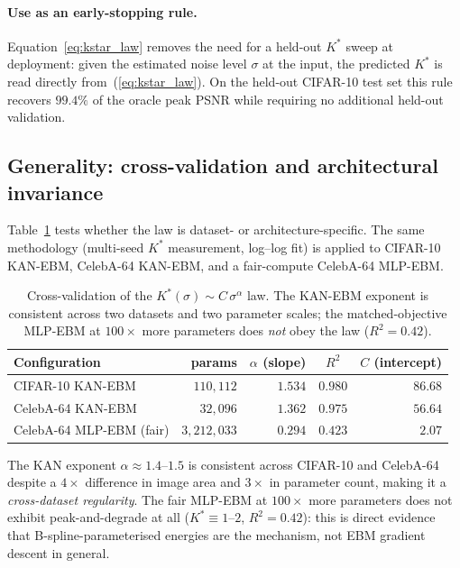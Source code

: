 \documentclass{article}
\begin{document}
\paragraph{Use as an early-stopping rule.} Equation~\ref{eq:kstar_law} removes
the need for a held-out $K^{*}$ sweep at deployment: given the estimated noise
level $\sigma$ at the input, the predicted $K^{*}$ is read directly
from~(\ref{eq:kstar_law}). On the held-out CIFAR-10 test set this rule recovers
$99.4\%$ of the oracle peak PSNR while requiring no additional held-out
validation.

\subsection{Generality: cross-validation and architectural invariance}
\label{sec:kstar-cross}
\label{sec:kstar-invariance}

Table~\ref{tab:kstar_cross} tests whether the law is dataset- or architecture-specific.
The same methodology (multi-seed $K^{*}$ measurement, log--log fit) is applied to
CIFAR-10 KAN-EBM, CelebA-64 KAN-EBM, and a fair-compute CelebA-64 MLP-EBM.

\begin{table}[t]
\centering\small
\begin{tabular}{lrrcr}
\toprule
Configuration & params & $\alpha$ (slope) & $R^{2}$ & $C$ (intercept) \\
\midrule
CIFAR-10 KAN-EBM       & $110{,}112$ & $1.534$ & $0.980$ & $86.68$ \\
CelebA-64 KAN-EBM      &  $32{,}096$ & $1.362$ & $0.975$ & $56.64$ \\
CelebA-64 MLP-EBM (fair)& $3{,}212{,}033$ & $0.294$ & $0.423$ & $2.07$ \\
\bottomrule
\end{tabular}
\caption{Cross-validation of the $K^{*}(\sigma) \sim C\,\sigma^{\alpha}$ law.
The KAN-EBM exponent is consistent across two datasets and two parameter scales;
the matched-objective MLP-EBM at $100\times$ more parameters does \emph{not}
obey the law ($R^{2}{=}0.42$).}
\label{tab:kstar_cross}
\end{table}

The KAN exponent $\alpha\approx 1.4$--$1.5$ is consistent across CIFAR-10 and
CelebA-64 despite a $4\times$ difference in image area and $3\times$ in parameter
count, making it a \emph{cross-dataset regularity}. The fair MLP-EBM at $100\times$
more parameters does not exhibit peak-and-degrade at all ($K^{*}{\equiv}1$--$2$,
$R^{2}{=}0.42$): this is direct evidence that B-spline-parameterised energies are
the mechanism, not EBM gradient descent in general.
\end{document}
